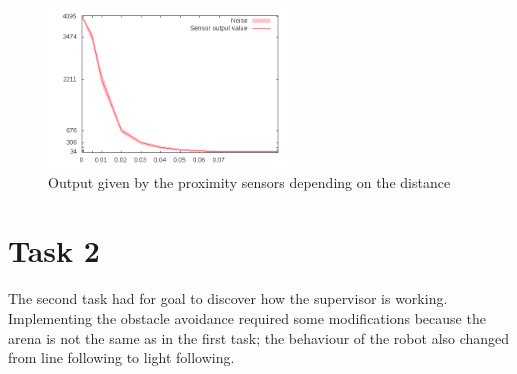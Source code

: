 \documentclass[lettersize,journal]{IEEEtran}
\begin{document}
\begin{figure}[H]
\centering
\includegraphics[width=2.5in]{distance_sensor.png}
\caption{Output given by the proximity sensors depending on the distance}
\label{distance_sensor}
\end{figure}

\section{Task 2}
The second task had for goal to discover how the supervisor is working. Implementing the obstacle avoidance required some modifications because the arena is not the same as in the first task; the behaviour of the robot also changed from line following to light following.
\end{document}
